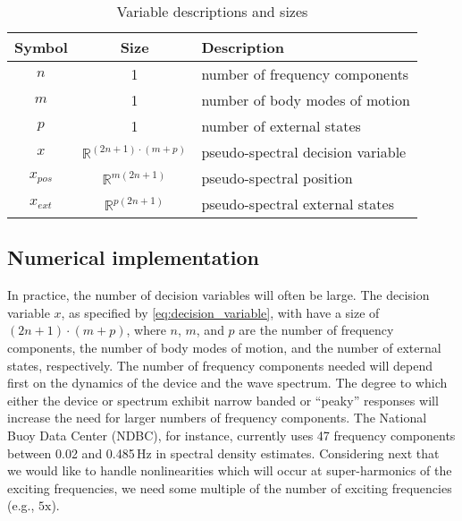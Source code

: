 \documentclass[]{article}
\begin{document}
\begin{table}[tb]
	\caption{Variable descriptions and sizes}
	\label{tab:variables}
	\centering

	\begin{tabular}{ccl}
	\hline

	\hline
	\textbf{Symbol} 	& \textbf{Size} 						& \textbf{Description} \\
	\hline
		$n$				& 1 									& number of frequency components \\
		$m$				& 1 									& number of body modes of motion \\
		$p$				& 1 									& number of external states \\
		$x$ 			& $\mathbb{R}^{(2n + 1) \cdot (m + p)}$ & pseudo-spectral decision variable \\
		$x_{pos}$ 		& $\mathbb{R}^{m(2n + 1)}$ 				& pseudo-spectral position \\
		$x_{ext}$ 		& $\mathbb{R}^{p(2n+1)}$ 				& pseudo-spectral external states \\
	\hline

	\hline
	\end{tabular}
\end{table}

\subsection{Numerical implementation}\label{sec:numericalImplementation}
In practice, the number of decision variables will often be large.
The decision variable $x$, as specified by \eqref{eq:decision_variable}, with have a size of $(2n + 1) \cdot (m + p)$, where $n$, $m$, and $p$ are the number of frequency components, the number of body modes of motion, and the number of external states, respectively.
The number of frequency components needed will depend first on the dynamics of the device and the wave spectrum.
The degree to which either the device or spectrum exhibit narrow banded or ``peaky'' responses will increase the need for larger numbers of frequency components.
The National Buoy Data Center (NDBC), for instance, currently uses 47 frequency components between 0.02 and 0.485\,Hz in spectral density estimates.
Considering next that we would like to handle nonlinearities which will occur at super-harmonics of the exciting frequencies, we need some multiple of the number of exciting frequencies (e.g., $5\textrm{x}$).
\end{document}
